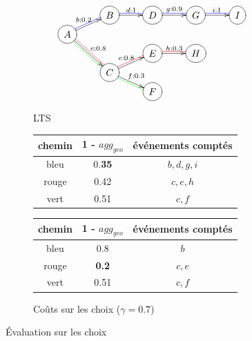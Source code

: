 \documentclass[11pt]{extarticle}
\begin{document}
\begin{figure}[h!]
    \centering
    \begin{subfigure}[b]{0.45\textwidth}
        \centering
        \[
            \xymatrix @R=0.1em{
                &  *++[o][F-]{B} \ar[r]^{d:1} \ar@[blue]@{-}@<2pt> [r]& *++[o][F-]{D} \ar[r]^{g:0.9} \ar@[blue]@{-}@<2pt>[r] &  *++[o][F-]{G} \ar@[blue]@{-}@<2pt> [r] \ar[r]^{i:1} & *++[o][F-]{I}
                \\ *++[o][F-]{A} \ar[ru]^{b:0.2} \ar[rdd]^{c:0.8}  \ar@[red]@{-}@< 2pt> [rdd] \ar@[green]@{-}@< -2pt> [rdd] \ar@[blue]@{-}@<2pt> [ru] & & & 
                \\ & & *++[o][F-]{E} \ar[r]^{h:0.3} \ar@[red]@{-}@<2pt> [r] & *++[o][F-]{H} &
                \\ & *++[o][F-]{C} \ar[ru]^{e:0.8} \ar@[red]@{-}@<2pt> [ru] \ar[rd]^{f:0.3} \ar@[green]@{-}@< -2pt> [rd]  & & &
                \\ & & *++[o][F-]{F}
            }
        \]
        \caption{LTS}
        \label{fig:lts_gamma}
    \end{subfigure}
    \hfill
    \begin{subfigure}[b]{0.45\textwidth}
        \centering
        \begin{tabular}{ccc}
            chemin & 1 - $agg_{geo}$ & événements comptés \\
            \hline
            bleu  & 0.\textbf{35} & $b,d,g,i$ \\
            rouge & 0.42 & $c,e,h$ \\
            vert  & 0.51 & $c,f$\\
        \end{tabular}
        \caption{Coûts globaux ($\gamma = 0.7$)}
        \label{tab:couts_global}

        \vspace{1em}

        \begin{tabular}{ccc}
            chemin & 1 - $agg_{geo}$  & événements comptés \\
            \hline
            bleu  & 0.8 & $b$ \\
            rouge & \textbf{0.2} & $c,e$ \\
            vert  & 0.51 & $c,f$ \\
        \end{tabular}
        \caption{Coûts sur les choix ($\gamma = 0.7$)}
        \label{tab:couts_choix}
    \end{subfigure}
    \caption{Évaluation sur les choix}
    \label{fig:choix}
\end{figure}
\end{document}
